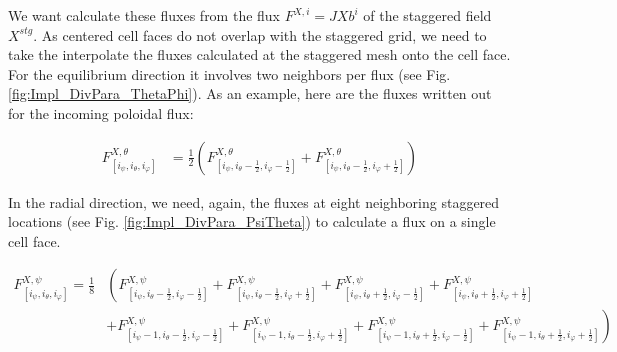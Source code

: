 We want calculate these fluxes from the flux $F^{X,i} = JXb^i$ of the staggered field $X^{stg}$. As centered cell faces do not overlap with the staggered grid, we need to take the interpolate the fluxes calculated at the staggered mesh onto the cell face. For the equilibrium direction it involves two neighbors per flux (see Fig. \ref{fig:Impl_DivPara_ThetaPhi}). As an example, here are the fluxes written out for the incoming poloidal flux:

\begin{align*}
	F_{[i_\psi,i_\theta, i_\varphi]}^{X,\theta} &= \frac{1}{2}\left(F_{[i_\psi,i_\theta-\frac{1}{2}, i_\varphi-\frac{1}{2}]}^{X,\theta} + F_{[i_\psi,i_\theta-\frac{1}{2}, i_\varphi+\frac{1}{2}]}^{X,\theta} \right)
\end{align*}

In the radial direction, we need, again, the fluxes at eight neighboring staggered locations (see Fig. \ref{fig:Impl_DivPara_PsiTheta}) to calculate a flux on a single cell face. 

\begin{align*}
	F_{[i_\psi,i_\theta, i_\varphi]}^{X,\psi} = \frac{1}{8}&\left(
	F_{[i_\psi,i_\theta-\frac{1}{2}, i_\varphi-\frac{1}{2}]}^{X,\psi} + 
	F_{[i_\psi,i_\theta-\frac{1}{2}, i_\varphi+\frac{1}{2}]}^{X,\psi} +
	F_{[i_\psi,i_\theta+\frac{1}{2}, i_\varphi-\frac{1}{2}]}^{X,\psi} + 
	F_{[i_\psi,i_\theta+\frac{1}{2}, i_\varphi+\frac{1}{2}]}^{X,\psi} 
	\right. \nonumber \\ &+\left.
	F_{[i_\psi-1,i_\theta-\frac{1}{2}, i_\varphi-\frac{1}{2}]}^{X,\psi} + 
	F_{[i_\psi-1,i_\theta-\frac{1}{2}, i_\varphi+\frac{1}{2}]}^{X,\psi} + 
	F_{[i_\psi-1,i_\theta+\frac{1}{2}, i_\varphi-\frac{1}{2}]}^{X,\psi} + 
	F_{[i_\psi-1,i_\theta+\frac{1}{2}, i_\varphi+\frac{1}{2}]}^{X,\psi} 	
	\right)
\end{align*}


